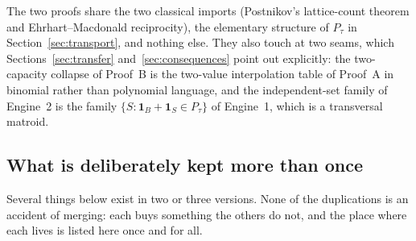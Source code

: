 \documentclass[11pt]{article}
\numberwithin{equation}{section}
\theoremstyle{definition}
\theoremstyle{remark}
\newcommand{\one}{\mathbf 1}
\begin{document}
\medskip
The two proofs share the two classical imports (Postnikov's lattice-count
theorem and Ehrhart--Macdonald reciprocity), the elementary structure of
$P_\tau$ in Section~\ref{sec:transport}, and nothing else. They also touch at
two seams, which Sections~\ref{sec:transfer} and~\ref{sec:consequences} point
out explicitly: the two-capacity collapse of Proof~B is the two-value
interpolation table of Proof~A in binomial rather than polynomial language,
and the independent-set family of Engine~2 is the family
$\{S:\one_B+\one_S\in P_\tau\}$ of Engine~1, which is a transversal matroid.

\subsection{What is deliberately kept more than once}
\label{sec:kept}

Several things below exist in two or three versions. None of the duplications
is an accident of merging: each buys something the others do not, and the
place where each lives is listed here once and for all.
\end{document}
